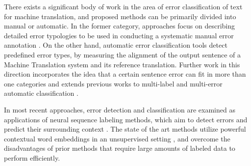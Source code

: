 There exists a significant body of work in the area of error classification of text for machine translation, and proposed methods can be primarily divided into manual or automatic. In the former category, approaches focus on describing detailed error typologies to be used in conducting a systematic manual error annotation \cite{fishel2011automatic,vilar2006error, lommel2014multidimensional, farrus2010linguistic, costa2015linguistically}. On the other hand,  automatic error classification tools \cite{zeman2011addicter, popovic2011hjerson,popovic2015poor} detect predefined error types, by measuring the alignment of the output sentence of a Machine Translation system and its reference translation. Further work in this direction incorporates the idea that a certain sentence error can fit in more than one categories \cite{klubivcka2018quantitative, lommel2014assessing} and extends previous works to multi-label and multi-error automatic classification \citet{popovic2019automatic}. 

In most recent approaches, error detection and classification are examined as applications of neural sequence labeling methods, which aim to detect errors and predict their surrounding context \cite{rei2017semi}. The state of the art methods utilize powerful contextual word embeddings in an unsupervised setting \cite{bell2019context}, and overcome the disadvantages of prior methods that require large amounts of labeled data to perform efficiently.
